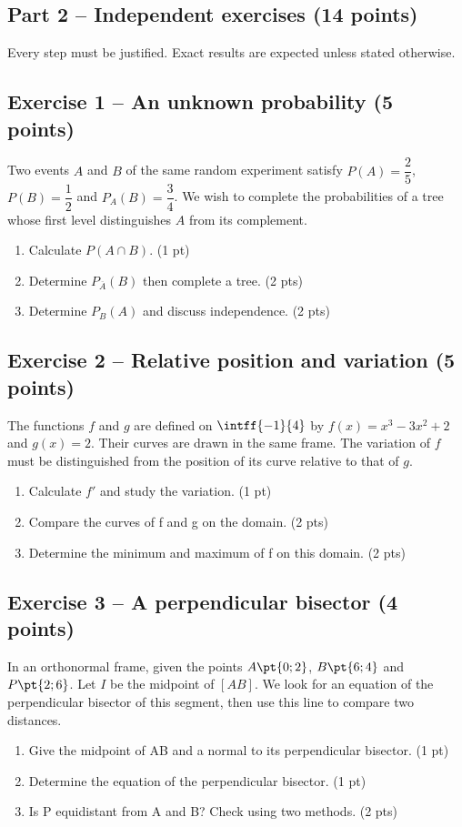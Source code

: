 \mxnewpage\subsection*{Part 2 -- Independent exercises (14 points)}
Every step must be justified. Exact results are expected unless stated otherwise.
\subsection*{Exercise 1 -- An unknown probability (5 points)}
Two events $A$ and $B$ of the same random experiment satisfy $P(A)=\dfrac25$, $P(B)=\dfrac12$ and $P_A(B)=\dfrac34$. We wish to complete the probabilities of a tree whose first level distinguishes $A$ from its complement.
\begin{enumerate}
\item Calculate $P(A\cap B)$. \hfill(1 pt)
\item Determine $P_{\overline A}(B)$ then complete a tree. \hfill(2 pts)
\item Determine $P_B(A)$ and discuss independence. \hfill(2 pts)
\end{enumerate}
\subsection*{Exercise 2 -- Relative position and variation (5 points)}
The functions $f$ and $g$ are defined on $\intff{-1}{4}$ by $f(x)=x^3-3x^2+2$ and $g(x)=2$. Their curves are drawn in the same frame. The variation of $f$ must be distinguished from the position of its curve relative to that of $g$.
\begin{enumerate}
\item Calculate $f\prime$ and study the variation. \hfill(1 pt)
\item Compare the curves of f and g on the domain. \hfill(2 pts)
\item Determine the minimum and maximum of f on this domain. \hfill(2 pts)
\end{enumerate}
\subsection*{Exercise 3 -- A perpendicular bisector (4 points)}
In an orthonormal frame, given the points $A\pt{0;2}$, $B\pt{6;4}$ and $P\pt{2;6}$. Let $I$ be the midpoint of $[AB]$. We look for an equation of the perpendicular bisector of this segment, then use this line to compare two distances.
\begin{enumerate}
\item Give the midpoint of AB and a normal to its perpendicular bisector. \hfill(1 pt)
\item Determine the equation of the perpendicular bisector. \hfill(1 pt)
\item Is P equidistant from A and B? Check using two methods. \hfill(2 pts)
\end{enumerate}

